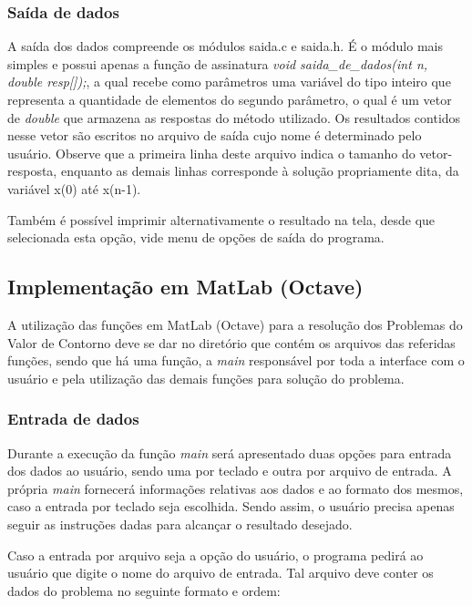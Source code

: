 \documentclass[
	article,			%
	11pt,				%
	oneside,			%
	a4paper,			%
	english,			%
	brazil,				%
	sumario=tradicional
	]{abntex2}
\begin{document}
\subsubsection{Saída de dados}

A saída dos dados compreende os módulos saida.c e saida.h. É o módulo mais simples e possui apenas a função de assinatura \emph{void saida\_de\_dados(int n, double resp[]);}, a qual recebe como parâmetros uma variável do tipo inteiro que representa a quantidade de elementos do segundo parâmetro, o qual é um vetor de \emph{double} que armazena as respostas do método utilizado. Os resultados contidos nesse vetor são escritos no arquivo de saída cujo nome é determinado pelo usuário. Observe que a primeira linha deste arquivo indica o tamanho do vetor-resposta, enquanto as demais linhas corresponde à solução propriamente dita, da variável x(0) até x(n-1).

Também é possível imprimir alternativamente o resultado na tela, desde que selecionada esta opção, vide menu de opções de saída do programa.

\subsection{Implementação em MatLab (Octave)}

A utilização das funções em MatLab (Octave) para a resolução dos Problemas do Valor de Contorno deve se dar no diretório que contém os arquivos
das referidas funções, sendo que há uma função, a \emph{main} responsável por toda a interface com o usuário e pela utilização
das demais funções para solução do problema.

\subsubsection{Entrada de dados}

Durante a execução da função \emph{main} será apresentado duas opções para entrada dos dados ao usuário, sendo uma por teclado
e outra por arquivo de entrada. A própria \emph{main} fornecerá informações relativas aos dados e ao formato dos mesmos, caso a
entrada por teclado seja escolhida. Sendo assim, o usuário precisa apenas seguir as instruções dadas para alcançar o resultado desejado.

Caso a entrada por arquivo seja a opção do usuário, o programa pedirá ao usuário que digite o nome do arquivo de entrada. Tal arquivo
deve conter os dados do problema no seguinte formato e ordem:
\end{document}
